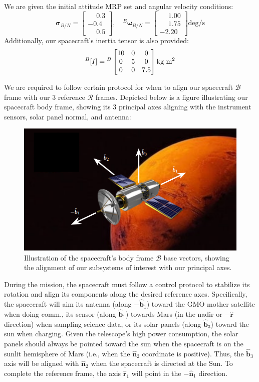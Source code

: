 \documentclass[conf]{new-aiaa}
\begin{document}
We are given the initial attitude MRP set and angular velocity conditions:
\[
\bm{\sigma}_{B/N} =
\begin{bmatrix}
\phantom{-}0.3 \\ -0.4 \\ \phantom{-}0.5
\end{bmatrix}, \quad
{}^B\bm{\omega}_{B/N} =
\begin{bmatrix}
\phantom{-}1.00 \\ \phantom{-}1.75 \\ -2.20
\end{bmatrix} \text{deg/s}
\]
Additionally, our spacecraft's inertia tensor is also provided:
\[
{}^B[I] = {}^B\begin{bmatrix}
10 & 0 & 0 \\
0 & 5 & 0 \\
0 & 0 & 7.5
\end{bmatrix} \text{kg m\textsuperscript{2}}
\]

We are required to follow certain protocol for when to align our spacecraft $\mathcal{B}$ frame with our 3 reference $\mathcal{R}$ frames. Depicted below is a figure illustrating our spacecraft body frame, showing its 3 principal axes aligning with the instrument sensors, solar panel normal, and antenna:
\begin{figure}[H]
    \centering
    \captionsetup{width=.7\linewidth}
    \includegraphics[width=.75\linewidth]{fig2.png}
    \caption{Illustration of the spacecraft's body frame $\mathcal{B}$ base vectors, showing the alignment of our subsystems of interest with our principal axes.}
    \label{fig:enter-label}
\end{figure}
During the mission, the spacecraft must follow a control protocol to stabilize its rotation and align its components along the desired reference axes. Specifically, the spacecraft will aim its antenna (along \( -\hat{\bm{b}}_1 \)) toward the GMO mother satellite when doing comm., its sensor (along \( \hat{\bm{b}}_1 \)) towards Mars (in the nadir or \( -\hat{\bm{r}} \) direction) when sampling science data, or its solar panels (along \( \hat{\bm{b}}_3 \)) toward the sun when charging. Given the telescope's high power consumption, the solar panels should always be pointed toward the sun when the spacecraft is on the sunlit hemisphere of Mars (i.e., when the \( \hat{\bm{n}}_2 \) coordinate is positive). Thus, the \( \hat{\bm{b}}_3 \) axis will be aligned with \( \hat{\bm{n}}_2 \) when the spacecraft is directed at the Sun. To complete the reference frame, the axis \( \hat{\bm{r}}_1 \) will point in the \( -\hat{\bm{n}}_1 \) direction.
\end{document}
